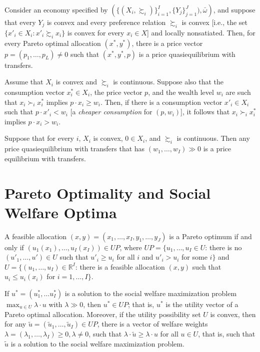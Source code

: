 \begin{prop}
    Consider an economy specified by $\left(\{(X_i, \succsim_i)\}_{i = 1}^I, \{Y_j\}_{j = 1}^J), \bar{\omega}\right)$, and suppose that every $Y_j$ is convex and every preference relation $\succsim_i$ is convex [i.e., the set $\{x'_i \in X_i : x'_i \succsim_i x_i\}$ is convex for every $x_i \in X$] and locally nonsatiated. Then, for every Pareto optimal allocation $(x^*, y^*)$, there is a price vector $p = (p_1, \dots, p_L) \neq 0$ such that $(x^*, y^*, p)$ is a price quasiequilibrium with transfers.
\end{prop}

\begin{prop}
    Assume that $X_i$ is convex and $\succsim_i$ is continuous. Suppose also that the consumption vector $x^*_i \in X_i$, the price vector $p$, and the wealth level $w_i$ are such that $x_i \succ_i x^*_i$ implies $p \cdot x_i \geq w_i$. Then, if there is a consumption vector $x'_i \in X_i$ such that $p \cdot x'_i < w_i$ [a \emph{cheaper consumption} for $(p, w_i)$], it follows that $x_i \succ_i x^*_i$ implies $p \cdot x_i > w_i$.
\end{prop}

\begin{prop}
    Suppose that for every $i$, $X_i$ is convex, $0 \in X_i$, and $\succsim_i$ is continuous. Then any price quasiequilibrium with transfers that has $(w_1, \dots, w_I) \gg 0$ is a price equilibrium with transfers.
\end{prop}


\section{Pareto Optimality and Social Welfare Optima}

\begin{prop}
    A feasible allocation $(x, y) = (x_1, \dots, x_I, y_1, \dots, y_J)$ is a Pareto optimum if and only if $\left(u_1(x_1), \dots, u_I(x_I) \right) \in UP$, where
    $UP = \{u_1, \dots, u_I \in U$: there is no $(u'_1, \dots, u') \in U$ such that $u'_i \geq u_i$ for all $i$ and $u'_i > u_i$ for some $i \}$ and $U = \{(u_1, \dots, u_I) \in \mathbb{R}^I$: there is a feasible allocation $(x, y)$ such that $u_i \leq u_i(x_i)$ for $i = 1, \dots, I\}$.
\end{prop}

\begin{prop}
    If $u^* = (u^*_1, \dots u^*_I)$ is a solution to the social welfare maximization problem $\max_{u \in U} \lambda \cdot u$ with $\lambda \gg 0$, then $u^* \in UP$; that is, $u^*$ is the utility vector of a Pareto optimal allocation. Moreover, if the utility possibility set $U$ is convex, then for any $\tilde{u} = (\tilde{u}_1, \dots, \tilde{u}_I) \in UP$, there is a vector of welfare weights $\lambda = (\lambda_1, \dots, \lambda_I) \geq 0, \lambda \neq 0$, such that $\lambda \cdot \tilde{u} \geq \lambda \cdot u$ for all $u \in U$, that is, such that $\tilde{u}$ is a solution to the social welfare maximization problem.
\end{prop}


